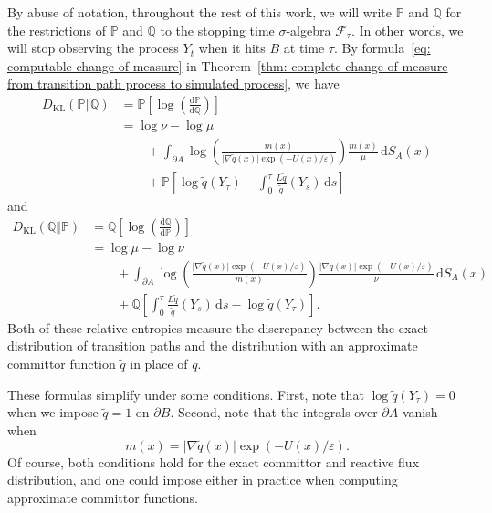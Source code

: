 \documentclass[reqno]{amsart}
\newcommand{\eps}{\varepsilon}
\newcommand{\1}{\mathds{1}}
\renewcommand{\d}{\mathrm{d}}
\newcommand{\grad}{\nabla}
\renewcommand{\P}{\mathds{P}}
\newcommand{\Q}{\mathds{Q}}
\newcommand{\E}{\mathds{E}}
\newcommand{\F}{\mathcal{F}}
\newcommand{\dkl}{D_{\mathrm{KL}}}
\theoremstyle{definition}
\theoremstyle{remark}
\begin{document}
By abuse of notation, throughout the rest of this work, we will write $\P$ and $\Q$ for the restrictions of $\P$ and $\Q$ to the stopping time $\sigma$-algebra $\F_\tau$. In other words, we will stop observing the process $Y_t$ when it hits $B$ at time $\tau$. 
By formula~\eqref{eq: computable change of measure} in Theorem~\ref{thm: complete change of measure from transition path process to simulated process}, we have
\begin{align}
  \dkl(\P \Vert \Q) %
                     &= \P \left [ \log \left ( \frac{\d \P}{\d \Q} \right ) \right ] \nonumber \\
                     &= \log \nu- \log \mu \nonumber \\
                     &\qquad + \int_{\partial A} \log \left ( \frac{ m(x)}{\lvert \grad  \tilde q (x) \rvert \exp(-U(x)/\eps)} \right ) \frac{m(x)}{\mu} \, \d S_A(x) \nonumber  \\
                     &\qquad + \P \left [\log \tilde q (Y_\tau)-\int_0^\tau  \frac{L  \tilde q}{\tilde q}(Y_s)\, \d s  \right ] \label{eqn: entropy of p given q}
\end{align}
and
\begin{align}
  \dkl( \Q \Vert \P) &= \Q \left [ \log \left ( \frac{\d \Q}{\d \P} \right ) \right ] \nonumber \\
                     &=\log \mu - \log \nu \nonumber \\
                     &\qquad +   \int_{\partial A} \log \left ( \frac{\lvert \grad  \tilde q (x) \rvert \exp(-U(x)/\eps)}{ m(x)} \right ) \frac{\lvert \grad q(x) \rvert \exp(-U(x)/\eps)}{\nu} \, \d S_A(x) \nonumber \\
                     &\qquad + \Q \left [  \int_0^\tau \frac{L \tilde q}{\tilde q}(Y_s) \, \d s - \log \tilde q (Y_\tau) \right ]. \label{eqn: entropy of q given p}
\end{align}
Both of these relative entropies measure the discrepancy between the exact distribution of transition paths and the distribution with an approximate committor function $\tilde q$ in place of $q$.


These formulas simplify under some conditions. First, note that $\log \tilde q(Y_\tau)=0$ when we impose $\tilde q =1$ on $\partial B$. Second, note that the integrals over $\partial A$ vanish when 
\begin{equation*}
  m(x) = \lvert \grad \tilde q(x) \rvert \exp(-U(x) / \eps).
\end{equation*}
Of course, both conditions hold for the exact committor and reactive flux distribution, and one could impose either in practice when computing approximate committor functions.   
\end{document}
